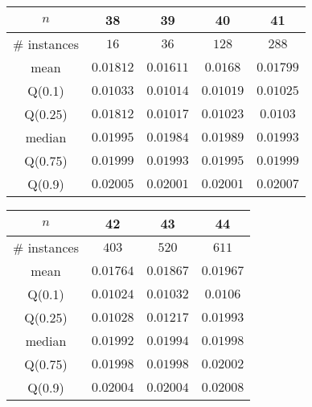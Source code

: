 \begin{tabular}{c|cccc} 
\hline 
$n$ & 38 & 39 & 40 & 41 \tabularnewline 
\hline 
\hline 
\# instances & $16$ & $36$ & $128$ & $288$ \tabularnewline 
mean & $0.01812$ & $0.01611$ & $0.0168$ & $0.01799$ \tabularnewline 
Q(0.1) & $0.01033$ & $0.01014$ & $0.01019$ & $0.01025$ \tabularnewline 
Q(0.25) & $0.01812$ & $0.01017$ & $0.01023$ & $0.0103$ \tabularnewline 
median & $0.01995$ & $0.01984$ & $0.01989$ & $0.01993$ \tabularnewline 
Q(0.75) & $0.01999$ & $0.01993$ & $0.01995$ & $0.01999$ \tabularnewline 
Q(0.9) & $0.02005$ & $0.02001$ & $0.02001$ & $0.02007$ \tabularnewline 
\hline 
\end{tabular} 
\medskip{} 

\begin{tabular}{c|ccc} 
\hline 
$n$ & 42 & 43 & 44 \tabularnewline 
\hline 
\hline 
\# instances & $403$ & $520$ & $611$ \tabularnewline 
mean & $0.01764$ & $0.01867$ & $0.01967$ \tabularnewline 
Q(0.1) & $0.01024$ & $0.01032$ & $0.0106$ \tabularnewline 
Q(0.25) & $0.01028$ & $0.01217$ & $0.01993$ \tabularnewline 
median & $0.01992$ & $0.01994$ & $0.01998$ \tabularnewline 
Q(0.75) & $0.01998$ & $0.01998$ & $0.02002$ \tabularnewline 
Q(0.9) & $0.02004$ & $0.02004$ & $0.02008$ \tabularnewline 
\hline 
\end{tabular} 
\medskip{} 

